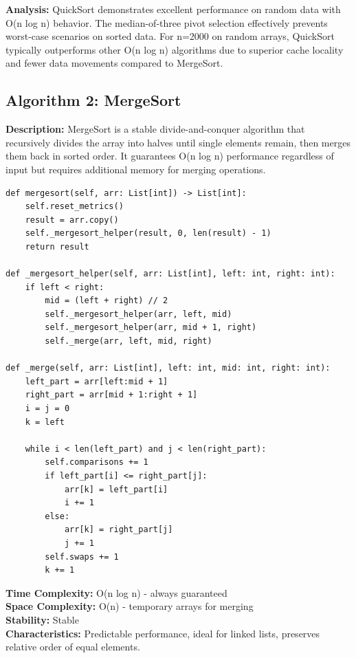 \documentclass[12pt]{article}
\begin{document}
\textbf{Analysis:} QuickSort demonstrates excellent performance on random data with O(n log n) behavior. The median-of-three pivot selection effectively prevents worst-case scenarios on sorted data. For n=2000 on random arrays, QuickSort typically outperforms other O(n log n) algorithms due to superior cache locality and fewer data movements compared to MergeSort.

\clearpage
\subsection{Algorithm 2: MergeSort}

\textbf{Description:} MergeSort is a stable divide-and-conquer algorithm that recursively divides the array into halves until single elements remain, then merges them back in sorted order. It guarantees O(n log n) performance regardless of input but requires additional memory for merging operations.

\begin{lstlisting}[caption={MergeSort Implementation}]
def mergesort(self, arr: List[int]) -> List[int]:
    self.reset_metrics()
    result = arr.copy()
    self._mergesort_helper(result, 0, len(result) - 1)
    return result

def _mergesort_helper(self, arr: List[int], left: int, right: int):
    if left < right:
        mid = (left + right) // 2
        self._mergesort_helper(arr, left, mid)
        self._mergesort_helper(arr, mid + 1, right)
        self._merge(arr, left, mid, right)

def _merge(self, arr: List[int], left: int, mid: int, right: int):
    left_part = arr[left:mid + 1]
    right_part = arr[mid + 1:right + 1]
    i = j = 0
    k = left
    
    while i < len(left_part) and j < len(right_part):
        self.comparisons += 1
        if left_part[i] <= right_part[j]:
            arr[k] = left_part[i]
            i += 1
        else:
            arr[k] = right_part[j]
            j += 1
        self.swaps += 1
        k += 1
\end{lstlisting}

\textbf{Time Complexity:} O(n log n) - always guaranteed \\
\textbf{Space Complexity:} O(n) - temporary arrays for merging \\
\textbf{Stability:} Stable \\
\textbf{Characteristics:} Predictable performance, ideal for linked lists, preserves relative order of equal elements.
\end{document}
